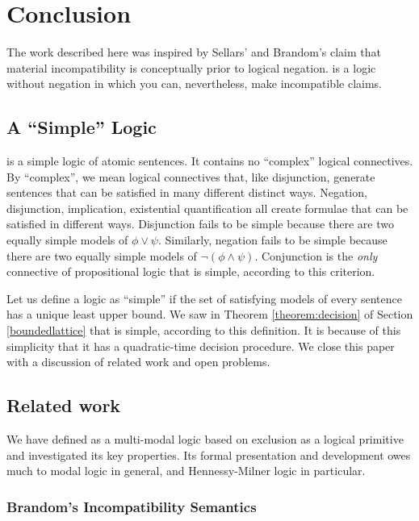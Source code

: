 \section{Conclusion}\label{conclusion}

The work described here was inspired by Sellars' and Brandom's claim
that material incompatibility is conceptually prior to logical
negation.
\Cathoristic{} is a logic without negation in which you can, nevertheless, make incompatible claims.

\subsection{A ``Simple'' Logic}
\Cathoristic{} is a simple logic of atomic sentences.  It contains no
``complex'' logical connectives.  
By ``complex'', we mean logical
connectives that, like disjunction, generate sentences that can be
satisfied in many different distinct ways.  
Negation, disjunction,
implication, existential quantification all create formulae that can
be satisfied in different ways.  
 Disjunction
fails to be simple because there are two equally simple models of
$\phi \lor \psi$.  Similarly, negation fails to be simple because
there are two equally simple models of $\neg (\phi \land \psi)$.
Conjunction is the \emph{only} connective of propositional logic that
is simple, according to this criterion.

Let us define a logic as ``simple'' if the set of satisfying
models of every sentence has a unique least upper bound. 
We saw in Theorem \ref{theorem:decision} of Section \ref{boundedlattice} that \cathoristic{} is simple, according to this definition.
It is because of this simplicity that it has a quadratic-time decision procedure.
 We close this paper with a discussion of related work and open
problems.

\subsection{Related work} 

We have defined \cathoristic{} as a multi-modal logic based on
exclusion as a logical primitive and investigated its key properties.
Its formal presentation and development owes much to modal
logic in general, and Hennessy-Milner logic in particular.

\subsubsection{Brandom's Incompatibility Semantics}

